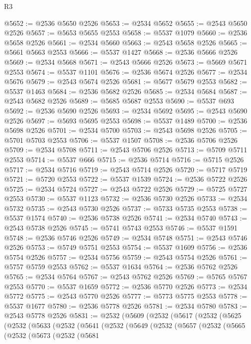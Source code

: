 \begin{lexlean}{R3}
\begin{coremodule}
@5652 := @2536 @5650 @2526
@5653 := @2534 @5652
@5655 := @2543 @5650 @2526
@5657 := @5653 @5655 @2553
@5658 := @5537 @1079
@5660 := @2536 @5658 @2526
@5661 := @2534 @5660
@5663 := @2543 @5658 @2526
@5665 := @5661 @5663 @2553
@5666 := @5537 @1427
@5668 := @2536 @5666 @2526
@5669 := @2534 @5668
@5671 := @2543 @5666 @2526
@5673 := @5669 @5671 @2553
@5674 := @5537 @1101
@5676 := @2536 @5674 @2526
@5677 := @2534 @5676
@5679 := @2543 @5674 @2526
@5681 := @5677 @5679 @2553
@5682 := @5537 @1463
@5684 := @2536 @5682 @2526
@5685 := @2534 @5684
@5687 := @2543 @5682 @2526
@5689 := @5685 @5687 @2553
@5690 := @5537 @693
@5692 := @2536 @5690 @2526
@5693 := @2534 @5692
@5695 := @2543 @5690 @2526
@5697 := @5693 @5695 @2553
@5698 := @5537 @1489
@5700 := @2536 @5698 @2526
@5701 := @2534 @5700
@5703 := @2543 @5698 @2526
@5705 := @5701 @5703 @2553
@5706 := @5537 @1507
@5708 := @2536 @5706 @2526
@5709 := @2534 @5708
@5711 := @2543 @5706 @2526
@5713 := @5709 @5711 @2553
@5714 := @5537 @666
@5715 := @2536 @5714
@5716 := @5715 @2526
@5717 := @2534 @5716
@5719 := @2543 @5714 @2526
@5720 := @5717 @5719
@5721 := @5720 @2553
@5722 := @5537 @1539
@5724 := @2536 @5722 @2526
@5725 := @2534 @5724
@5727 := @2543 @5722 @2526
@5729 := @5725 @5727 @2553
@5730 := @5537 @1123
@5732 := @2536 @5730 @2526
@5733 := @2534 @5732
@5735 := @2543 @5730 @2526
@5737 := @5733 @5735 @2553
@5738 := @5537 @1574
@5740 := @2536 @5738 @2526
@5741 := @2534 @5740
@5743 := @2543 @5738 @2526
@5745 := @5741 @5743 @2553
@5746 := @5537 @1591
@5748 := @2536 @5746 @2526
@5749 := @2534 @5748
@5751 := @2543 @5746 @2526
@5753 := @5749 @5751 @2553
@5754 := @5537 @1609
@5756 := @2536 @5754 @2526
@5757 := @2534 @5756
@5759 := @2543 @5754 @2526
@5761 := @5757 @5759 @2553
@5762 := @5537 @1634
@5764 := @2536 @5762 @2526
@5765 := @2534 @5764
@5767 := @2543 @5762 @2526
@5769 := @5765 @5767 @2553
@5770 := @5537 @1659
@5772 := @2536 @5770 @2526
@5773 := @2534 @5772
@5775 := @2543 @5770 @2526
@5777 := @5773 @5775 @2553
@5778 := @5537 @1677
@5780 := @2536 @5778 @2526
@5781 := @2534 @5780
@5783 := @2543 @5778 @2526
@5831 := @2532
    (@5609
      (@2532
        (@5617
          (@2532
            (@5625
              (@2532
                (@5633
                  (@2532
                    (@5641
                      (@2532
                        (@5649
                          (@2532
                            (@5657
                              (@2532
                                (@5665
                                  (@2532
                                    (@5673
                                      (@2532
                                        (@5681

\end{coremodule}
\end{lexlean}
